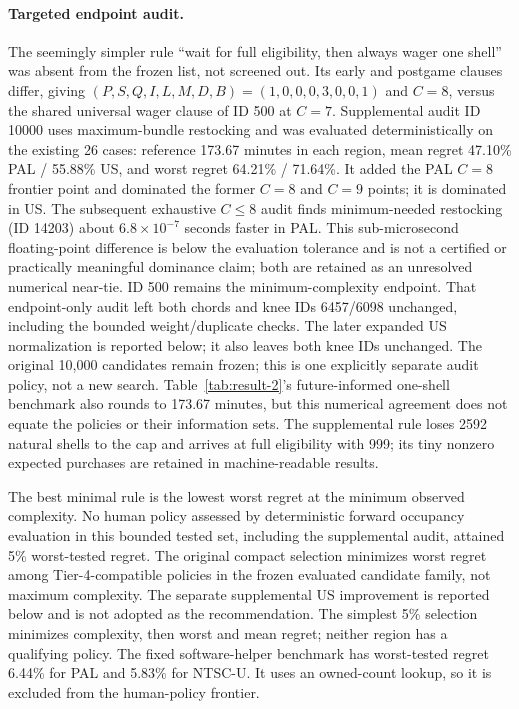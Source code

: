 \documentclass[11pt]{article}
\theoremstyle{definition}\newtheorem{definition}[theorem]{Definition}
\begin{document}
\paragraph{Targeted endpoint audit.}
The seemingly simpler rule ``wait for full eligibility, then always wager one shell'' was absent from the frozen list, not screened out. Its early and postgame clauses differ, giving $(P,S,Q,I,L,M,D,B)=(1,0,0,0,3,0,0,1)$ and $C=8$, versus the shared universal wager clause of ID 500 at $C=7$. Supplemental audit ID 10000 uses maximum-bundle restocking and was evaluated deterministically on the existing 26 cases: reference 173.67 minutes in each region, mean regret 47.10\% PAL / 55.88\% US, and worst regret 64.21\% / 71.64\%. It added the PAL $C=8$ frontier point and dominated the former $C=8$ and $C=9$ points; it is dominated in US. The subsequent exhaustive $C\le8$ audit finds minimum-needed restocking (ID 14203) about $6.8\times10^{-7}$ seconds faster in PAL. This sub-microsecond floating-point difference is below the evaluation tolerance and is not a certified or practically meaningful dominance claim; both are retained as an unresolved numerical near-tie. ID 500 remains the minimum-complexity endpoint. That endpoint-only audit left both chords and knee IDs 6457/6098 unchanged, including the bounded weight/duplicate checks. The later expanded US normalization is reported below; it also leaves both knee IDs unchanged. The original 10,000 candidates remain frozen; this is one explicitly separate audit policy, not a new search. Table~\ref{tab:result-2}'s future-informed one-shell benchmark also rounds to 173.67 minutes, but this numerical agreement does not equate the policies or their information sets. The supplemental rule loses 2592 natural shells to the cap and arrives at full eligibility with 999; its tiny nonzero expected purchases are retained in machine-readable results.

The best minimal rule is the lowest worst regret at the minimum observed complexity. No human policy assessed by deterministic forward occupancy evaluation in this bounded tested set, including the supplemental audit, attained 5\% worst-tested regret. The original compact selection minimizes worst regret among Tier-4-compatible policies in the frozen evaluated candidate family, not maximum complexity. The separate supplemental US improvement is reported below and is not adopted as the recommendation. The simplest 5\% selection minimizes complexity, then worst and mean regret; neither region has a qualifying policy. The fixed software-helper benchmark has worst-tested regret 6.44\% for PAL and 5.83\% for NTSC-U. It uses an owned-count lookup, so it is excluded from the human-policy frontier.
\end{document}
